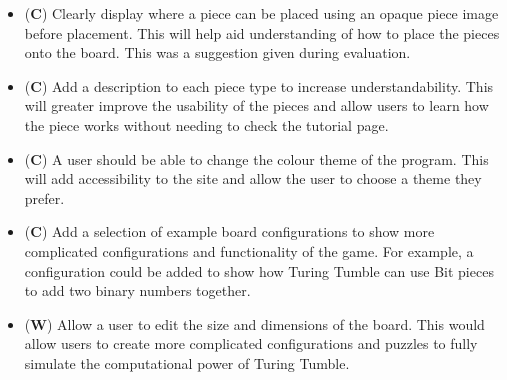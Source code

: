 \documentclass{l4proj}
\begin{document}
\begin{itemize}
    \item (\textbf{C}) Clearly display where a piece can be placed using an opaque piece image before placement. This will help aid understanding of how to place the pieces onto the board. This was a suggestion given during evaluation.
    \item (\textbf{C}) Add a description to each piece type to increase understandability. This will greater improve the usability of the pieces and allow users to learn how the piece works without needing to check the tutorial page.
    \item (\textbf{C}) A user should be able to change the colour theme of the program. This will add accessibility to the site and allow the user to choose a theme they prefer.
    \item (\textbf{C}) Add a selection of example board configurations to show more complicated configurations and functionality of the game. For example, a configuration could be added to show how Turing Tumble can use Bit pieces to add two binary numbers together.
    \item (\textbf{W}) Allow a user to edit the size and dimensions of the board. This would allow users to create more complicated configurations and puzzles to fully simulate the computational power of Turing Tumble.
\end{itemize}
\end{document}
